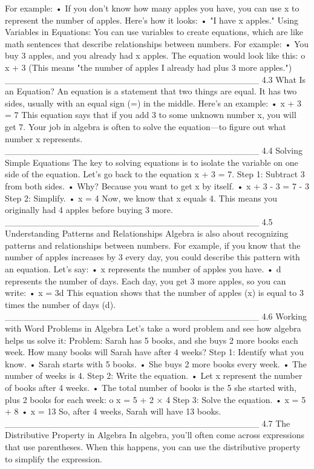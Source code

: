 For example:
•	If you don’t know how many apples you have, you can use x to represent the number of apples.
Here’s how it looks:
•	"I have x apples."
Using Variables in Equations: You can use variables to create equations, which are like math sentences that describe relationships between numbers.
For example:
•	You buy 3 apples, and you already had x apples. The equation would look like this:
o	x + 3 (This means "the number of apples I already had plus 3 more apples.")
________________________________________
4.3 What Is an Equation?
An equation is a statement that two things are equal. It has two sides, usually with an equal sign (=) in the middle.
Here’s an example:
•	x + 3 = 7
This equation says that if you add 3 to some unknown number x, you will get 7.
Your job in algebra is often to solve the equation—to figure out what number x represents.
________________________________________
4.4 Solving Simple Equations
The key to solving equations is to isolate the variable on one side of the equation. Let’s go back to the equation x + 3 = 7.
Step 1: Subtract 3 from both sides.
•	Why? Because you want to get x by itself.
•	x + 3 - 3 = 7 - 3
Step 2: Simplify.
•	x = 4
Now, we know that x equals 4. This means you originally had 4 apples before buying 3 more.
________________________________________
4.5 Understanding Patterns and Relationships
Algebra is also about recognizing patterns and relationships between numbers. For example, if you know that the number of apples increases by 3 every day, you could describe this pattern with an equation.
Let’s say:
•	x represents the number of apples you have.
•	d represents the number of days.
Each day, you get 3 more apples, so you can write:
•	x = 3d
This equation shows that the number of apples (x) is equal to 3 times the number of days (d).
________________________________________
4.6 Working with Word Problems in Algebra
Let’s take a word problem and see how algebra helps us solve it:
Problem: Sarah has 5 books, and she buys 2 more books each week. How many books will Sarah have after 4 weeks?
Step 1: Identify what you know.
•	Sarah starts with 5 books.
•	She buys 2 more books every week.
•	The number of weeks is 4.
Step 2: Write the equation.
•	Let x represent the number of books after 4 weeks.
•	The total number of books is the 5 she started with, plus 2 books for each week:
o	x = 5 + 2 × 4
Step 3: Solve the equation.
•	x = 5 + 8
•	x = 13
So, after 4 weeks, Sarah will have 13 books.
________________________________________
4.7 The Distributive Property in Algebra
In algebra, you’ll often come across expressions that use parentheses. When this happens, you can use the distributive property to simplify the expression.
